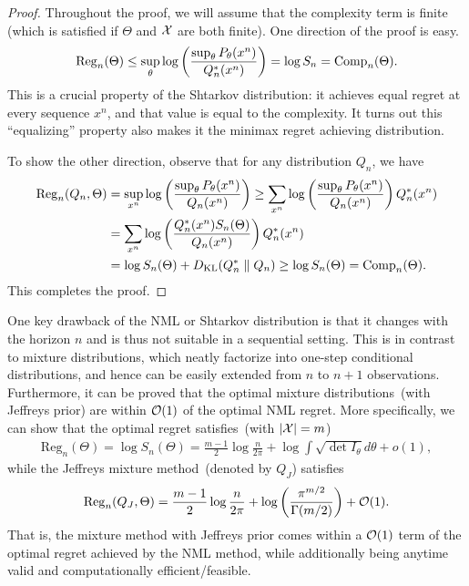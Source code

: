 \documentclass[12pt]{article}
\begin{document}
\begin{proof} Throughout the proof, we will assume that the complexity term is finite (which is satisfied if $\Theta$ and ${\cal X}$ are both finite).
    One direction of the proof is easy. 
    \begin{align}
        \mathrm{Reg}_n(\Theta) \leq \sup_{\theta} \log \left( \frac{\sup_{\theta} P_\theta(x^n)}{Q^*_n(x^n)} \right) = \log S_n = \mathrm{Comp}_n(\Theta). 
    \end{align}
    This is a crucial property of the Shtarkov distribution: it achieves equal regret at every sequence $x^n$, and that value is equal to the complexity. It turns out this ``equalizing'' property also makes it the minimax regret achieving distribution. 

    To show the other direction, observe that for any distribution $Q_n$, we have 
    \begin{align}
        \mathrm{Reg}_n(Q_n, \Theta) &= \sup_{x^n} \log \left( \frac{\sup_\theta P_\theta(x^n)}{Q_n(x^n)} \right) \geq \sum_{x^n} \log \left( \frac{\sup_\theta P_\theta(x^n)}{Q_n(x^n)} \right)  Q^*_n(x^n) \\
        & =  \sum_{x^n} \log \left( \frac{Q^*_n(x^n) S_n(\Theta)}{Q_n(x^n)} \right)  Q^*_n(x^n) \\
        & = \log S_n(\Theta) + D_{\text{KL}}(Q^*_n \parallel Q_n) 
         \geq \log S_n(\Theta) = \mathrm{Comp}_n(\Theta). 
    \end{align}
    This completes the proof. 
\end{proof}
One key drawback of the NML or Shtarkov distribution is that it changes with the horizon $n$ and is thus not suitable in a sequential setting. This is in contrast to mixture distributions, which neatly factorize into one-step conditional distributions, and hence can be easily extended from $n$ to $n+1$ observations. Furthermore, it can be proved that the optimal mixture distributions~(with Jeffreys prior) are within ${\cal O}(1)$ of the optimal NML regret. More specifically, we can show that the optimal regret satisfies~(with $|{\cal X}|=m$)
\begin{align}
    \mathrm{Reg}_n(\Theta) = \log S_n(\Theta) = \frac{m-1}{2} \log \frac{n}{2\pi} + \log \int \sqrt{\det I_\theta} d\theta + o(1), 
\end{align}
while the Jeffreys mixture method~(denoted by $Q_J$) satisfies 
\begin{align}
    \mathrm{Reg}_n(Q_J, \Theta) = \frac{m-1}{2} \log \frac n {2\pi} + \log \left(  \frac{\pi^{m/2}}{\Gamma(m/2)}\right)  + {\cal O}(1). 
\end{align}
That is, the mixture method with Jeffreys prior comes within a ${\cal O}(1)$ term of the optimal regret achieved by the NML method, while additionally being anytime valid and computationally efficient/feasible. 
\end{document}
